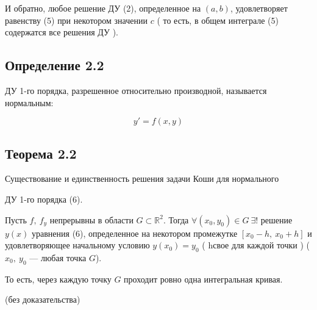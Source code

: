 {	И обратно, любое решение ДУ (2), определенное на $(a, b)$, удовлетворяет равенству (5) при некотором значении $c$ ( то есть, в общем интеграле   (5)   содержатся все решения  ДУ ).

	\subsection*{Определение 2.2}

	ДУ 1-го порядка, разрешенное относительно производной, называется нормальным:


	\[
	y' = f(x, y) \tag{6}
	\]



	\subsection*{Теорема 2.2}

	Существование и единственность решения задачи Коши для нормального

	ДУ 1-го порядка (6).

	Пусть $f,\ f_y$ непрерывны в области $G \subset \mathbb{R}^2$. Тогда $\forall(x_0, y_0) \in G\ \exists!$ решение
	$y(x)$ уравнения (6), определенное на некотором промежутке $\left[x_0 - h,\ x_0 + h \right]$ и удовлетворяющее начальному условию $y(x_0) = y_0$ (  hсвое для каждой точки ) ($x_0,\ y_0$ — любая точка $G$).

	То есть, через каждую точку $G$ проходит ровно одна интегральная кривая.

	(без доказательства)

	\newpage
}